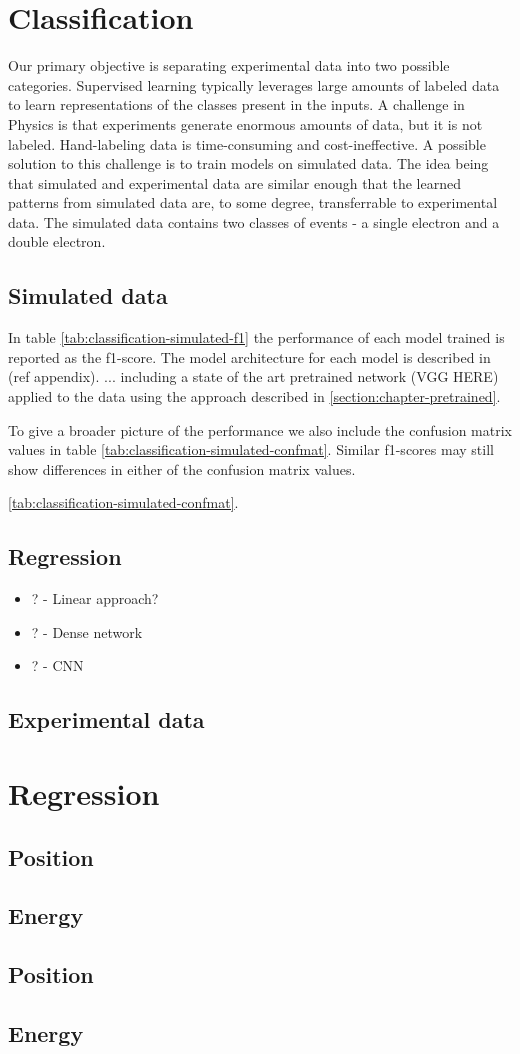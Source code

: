 \section{Classification}
Our primary objective is separating experimental data into two possible categories.
Supervised learning typically leverages large amounts of labeled data to learn
representations of the classes present in the inputs. A challenge in Physics is that
experiments generate enormous amounts of data, but it is not labeled. Hand-labeling
data is time-consuming and cost-ineffective. A possible solution to this challenge
is to train models on simulated data. The idea being that simulated and experimental
data are similar enough that the learned patterns from simulated data are, to some degree,
transferrable to experimental data.
The simulated data contains two classes of events - a single electron and a double electron.
\subsection{Simulated data}
In table \ref{tab:classification-simulated-f1} the performance of each model trained is reported
as the f1-score. The model architecture for each model is described in (ref appendix).
... including a state of the art pretrained network (\cite{}VGG HERE) applied to the data using
the approach described in \ref{section:chapter-pretrained}.

To give a broader picture of the performance we also include the confusion matrix values in
table \ref{tab:classification-simulated-confmat}. Similar f1-scores may still show differences
in either of the confusion matrix values.

\ref{tab:classification-simulated-confmat}.

\subsection{Regression}

\begin{itemize}
  \item ? - Linear approach?
  \item ? - Dense network
  \item ? - CNN
\end{itemize}
\subsection{Experimental data}
\section{Regression}
\subsection{Position}
\subsection{Energy}
\subsection{Position}
\subsection{Energy}
